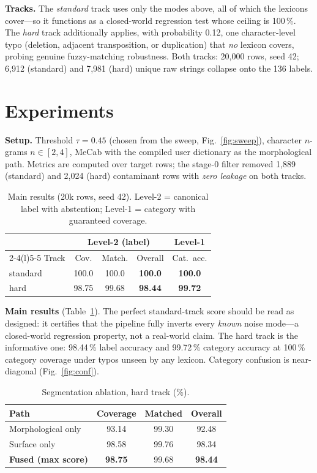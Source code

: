 \documentclass[10pt,twocolumn]{article}
\begin{document}
\textbf{Tracks.} The \emph{standard} track uses only the modes above, all of
which the lexicons cover---so it functions as a closed-world regression
test whose ceiling is 100\,\%. The \emph{hard} track additionally applies,
with probability 0.12, one character-level typo (deletion, adjacent
transposition, or duplication) that \emph{no} lexicon covers, probing
genuine fuzzy-matching robustness. Both tracks: 20{,}000 rows, seed 42;
6{,}912 (standard) and 7{,}981 (hard) unique raw strings collapse onto the
136 labels.

\section{Experiments}
\label{sec:results}

\textbf{Setup.} Threshold $\tau{=}0.45$ (chosen from the sweep,
Fig.~\ref{fig:sweep}), character $n$-grams $n\in[2,4]$, MeCab with the
compiled user dictionary as the morphological path. Metrics are computed
over target rows; the stage-0 filter removed 1{,}889 (standard) and 2{,}024
(hard) contaminant rows with \emph{zero leakage} on both tracks.

\begin{table}[t]
\centering
\small
\caption{Main results (20k rows, seed 42). Level-2 = canonical label with
abstention; Level-1 = category with guaranteed coverage.}
\label{tab:main}
\begin{tabular}{@{}lcccc@{}}
\toprule
& \multicolumn{3}{c}{Level-2 (label)} & Level-1 \\
\cmidrule(lr){2-4}\cmidrule(l){5-5}
Track & Cov. & Match. & Overall & Cat.\ acc. \\
\midrule
standard & 100.0 & 100.0 & \textbf{100.0} & \textbf{100.0} \\
hard     & 98.75 & 99.68 & \textbf{98.44} & \textbf{99.72} \\
\bottomrule
\end{tabular}
\end{table}

\textbf{Main results} (Table~\ref{tab:main}). The perfect standard-track
score should be read as designed: it certifies that the pipeline fully
inverts every \emph{known} noise mode---a closed-world regression property,
not a real-world claim. The hard track is the informative one: 98.44\,\%
label accuracy and 99.72\,\% category accuracy at 100\,\% category coverage
under typos unseen by any lexicon. Category confusion is near-diagonal
(Fig.~\ref{fig:conf}).

\begin{table}[t]
\centering
\small
\caption{Segmentation ablation, hard track (\%).}
\label{tab:ablation}
\begin{tabular}{@{}lccc@{}}
\toprule
Path & Coverage & Matched & Overall \\
\midrule
Morphological only & 93.14 & 99.30 & 92.48 \\
Surface only       & 98.58 & 99.76 & 98.34 \\
\textbf{Fused (max score)} & \textbf{98.75} & 99.68 & \textbf{98.44} \\
\bottomrule
\end{tabular}
\end{table}
\end{document}

